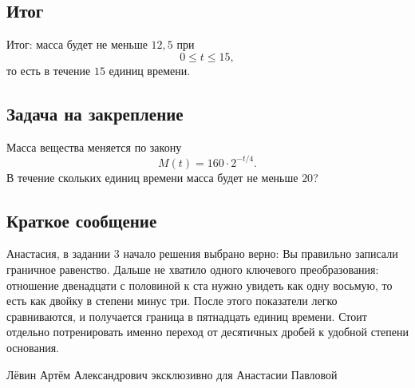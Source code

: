 \documentclass[12pt,a4paper]{article}
\begin{document}
\subsection*{Итог}
\textcolor{teal!60!black}{Итог:} масса будет не меньше \(12{,}5\) при
\[
0\le t\le 15,
\]
то есть в течение \(15\) единиц времени.

\subsection*{Задача на закрепление}
Масса вещества меняется по закону
\[
M(t)=160\cdot 2^{-t/4}.
\]
В течение скольких единиц времени масса будет не меньше \(20\)?

\subsection*{Краткое сообщение}
Анастасия, в задании 3 начало решения выбрано верно: Вы правильно записали граничное равенство. Дальше не хватило одного ключевого преобразования: отношение двенадцати с половиной к ста нужно увидеть как одну восьмую, то есть как двойку в степени минус три. После этого показатели легко сравниваются, и получается граница в пятнадцать единиц времени. Стоит отдельно потренировать именно переход от десятичных дробей к удобной степени основания.

\vfill
\begin{center}
\small Лёвин Артём Александрович эксклюзивно для Анастасии Павловой
\end{center}
\end{document}
